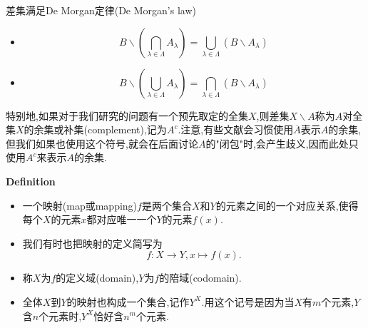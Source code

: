 \begin{frame}
	差集满足\alert{De Morgan定律}(De Morgan's law)
	\begin{itemize}
		\item \begin{equation}
			B\backslash\left(\bigcap_{\lambda\in\Lambda}A_{\lambda} \right) = \bigcup_{\lambda\in\Lambda}\left(B\backslash A_\lambda\right)
		\end{equation}
		\item \begin{equation}
			B\backslash\left(\bigcup_{\lambda\in\Lambda}A_{\lambda} \right) = \bigcap_{\lambda\in\Lambda}\left(B\backslash A_\lambda\right)
		\end{equation}
	\end{itemize}
	特别地,如果对于我们研究的问题有一个预先取定的全集$X$,则差集$X\backslash A$称为$A$对全集$X$的\alert{余集}或\alert{补集}(complement),记为$A^{c}$.注意,有些文献会习惯使用$\overline{A}$表示$A$的余集,但我们如果也使用这个符号,就会在后面讨论$A$的"闭包"时,会产生歧义,因而此处只使用$A^{c}$来表示$A$的余集.
\end{frame}
\begin{frame}
	\begin{block}{\textbf{Definition}}
		\begin{itemize}
			\item 一个\alert{映射}(map或mapping)$f$是两个集合$X$和$Y$的元素之间的一个对应关系,使得每个$X$的元素$x$都对应唯一一个$Y$的元素$f(x)$.
			\item 我们有时也把映射的定义简写为\begin{equation}
				f:X\rightarrow Y,x\mapsto f(x).
				\end{equation}
			\item 称$X$为$f$的\alert{定义域}(domain),$Y$为$f$的\alert{陪域}(codomain).
			\item 全体$X$到$Y$的映射也构成一个集合,记作$Y^X$.用这个记号是因为当$X$有$m$个元素,$Y$含$n$个元素时,$Y^X$恰好含$n^m$个元素.
		\end{itemize}	
	\end{block}
\end{frame}

